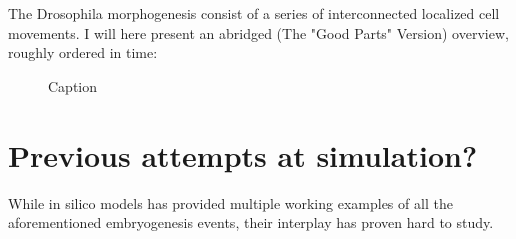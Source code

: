 The Drosophila morphogenesis consist of a series of interconnected localized cell movements. I will here present an abridged (The "Good Parts" Version) overview, roughly ordered in time:
\newpage

\begin{figure}[H]
    \centering
    \vspace*{-1cm}
    \caption{Caption}
    \label{fig:enter-label}
\end{figure}
\newpage

\section{Previous attempts at simulation?}
While in silico models has provided multiple working examples of all the aforementioned embryogenesis events, their interplay has proven hard to study.

